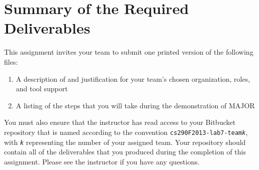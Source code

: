 \section*{Summary of the Required Deliverables}

This assignment invites your team to submit one printed version of the following files:
\vspace*{-.1in}
\begin{enumerate}
	\itemsep0em 
	\item A description of and justification for your team's chosen organization, roles, and tool support
	\item A listing of the steps that you will take during the demonstration of MAJOR
\end{enumerate}
\vspace*{-.1in}

You must also ensure that the instructor has read access to your Bitbucket repository that is named according to the
convention {\tt cs290F2013-lab7-team{\em k}}, with {\tt {\em k}} representing the number of your assigned team.  Your
repository should contain all of the deliverables that you produced during the completion of this assignment.  Please
see the instructor if you have any questions.


